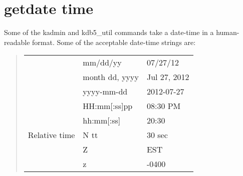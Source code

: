 \documentclass[letterpaper,10pt,english]{sphinxmanual}
\begin{document}
\section{getdate time}
\label{\detokenize{basic/date_format:getdate-time}}\label{\detokenize{basic/date_format:getdate}}
Some of the kadmin and kdb5\_util commands take a date-time in a
human-readable format.  Some of the acceptable date-time
strings are:
\begin{quote}


\begin{savenotes}\sphinxattablestart
\centering
\begin{tabulary}{\linewidth}[t]{|T|T|T|}
\hline
\sphinxstylethead{\sphinxstyletheadfamily \unskip}\relax &\relax &\relax \\
\hline{}%
&
mm/dd/yy
&
07/27/12
\\
&
month dd, yyyy
&
Jul 27, 2012
\\
&
yyyy-mm-dd
&
2012-07-27
\\
\hline{}%
&
HH:mm{[}:ss{]}pp
&
08:30 PM
\\
&
hh:mm{[}:ss{]}
&
20:30
\\
\hline
Relative
time
&
N tt
&
30 sec
\\
\hline{}%
&
Z
&
EST
\\
&
z
&
-0400
\\
\hline
\end{tabulary}
\par
\sphinxattableend\end{savenotes}
\end{quote}
\end{document}

